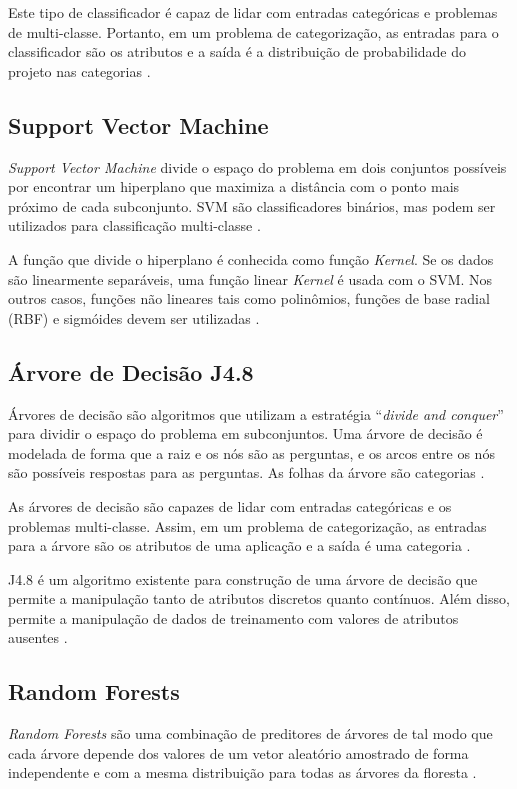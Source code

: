 \documentclass[conference]{IEEEtran}
\begin{document}
Este tipo de classificador é capaz de lidar com entradas categóricas e problemas de multi-classe. Portanto, em um problema de categorização, as entradas para o classificador são os atributos e a saída é a distribuição de probabilidade do projeto nas categorias \cite{IEEEhowto:linares}.

\subsection{Support Vector Machine}
{\it Support Vector Machine} divide o espaço do problema em dois conjuntos possíveis por encontrar um hiperplano que maximiza a distância com o ponto mais próximo de cada subconjunto. SVM são classificadores binários, mas podem ser utilizados para classificação multi-classe \cite{IEEEhowto:linares}. 

A função que divide o hiperplano é conhecida como função {\it Kernel}. Se os dados são linearmente separáveis, uma função linear {\it Kernel} é usada com o SVM. Nos outros casos, funções não lineares tais como polinômios, funções de base radial (RBF) e sigmóides devem ser utilizadas \cite{IEEEhowto:linares}.	

\subsection{Árvore de Decisão J4.8}
Árvores de decisão são algoritmos que utilizam a estratégia “{\it divide and conquer}” para dividir o espaço do problema em subconjuntos. Uma árvore de decisão é modelada de forma que a raiz e os nós são as perguntas, e os arcos entre os nós são possíveis respostas para as perguntas. As folhas da árvore são categorias \cite{IEEEhowto:linares}.

As árvores de decisão são capazes de lidar com entradas categóricas e os problemas multi-classe. Assim, em um problema de categorização, as entradas para a árvore são os atributos de uma aplicação e a saída é uma categoria \cite{IEEEhowto:linares}.

J4.8 é um algoritmo existente para construção de uma árvore de decisão que permite a manipulação tanto de atributos discretos quanto contínuos. Além disso, permite a manipulação de dados de treinamento com valores de atributos ausentes \cite{IEEEhowto:sandhu}. 
\subsection{Random Forests}
{\it Random Forests} são uma combinação de preditores de árvores de tal modo que cada árvore depende dos valores de um vetor aleatório amostrado de forma independente e com a mesma distribuição para todas as árvores da floresta \cite{IEEEhowto:breiman}. 
\end{document}
